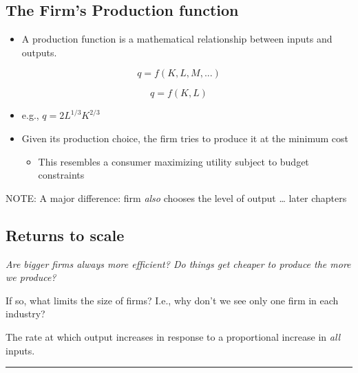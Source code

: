 \documentclass[]{article}
\providecommand{\tightlist}{%
  \setlength{\itemsep}{0pt}\setlength{\parskip}{0pt}}
\begin{document}
\hypertarget{the-firms-production-function}{%
\subsection{The Firm's Production function}\label{the-firms-production-function}}

\begin{itemize}
\tightlist
\item
  A production function is a mathematical relationship between inputs and outputs.
\end{itemize}

\bigskip

\[q = f( K, L, M, ...)\]

\[q = f(K, L)\]

\begin{itemize}
\item
  e.g., \(q =2L^{1/3}K^{2/3}\)
\item
  Given its production choice, the firm tries to produce it at the minimum cost

  \begin{itemize}
  \tightlist
  \item
    This resembles a consumer maximizing utility subject to budget constraints
  \end{itemize}
\end{itemize}

NOTE: A major difference: firm \emph{also} chooses the level of output \ldots{} later chapters

\hypertarget{returns-to-scale}{%
\subsection{Returns to scale}\label{returns-to-scale}}

\emph{Are bigger firms always more efficient? Do things get cheaper to produce the more we produce?}

If so, what limits the size of firms? I.e., why don't we see only one firm in each industry?

\begin{description}
\tightlist
\item[Returns to scale]
The rate at which output increases in response to a proportional increase in \emph{all} inputs.
\end{description}

\begin{center}\rule{0.5\linewidth}{\linethickness}\end{center}
\end{document}
